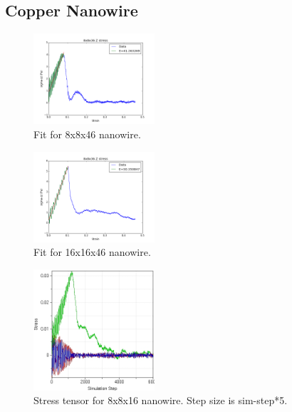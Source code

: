 \documentclass[11pt,twocolumn]{report}
\begin{document}
        \subsection{Copper Nanowire}
        \begin{figure}
            \label{fig:stress-small-fit}
            \centering
            \includegraphics[width=0.4\textwidth]{sigma33-small-fit.png}
            \caption{Fit for 8x8x46 nanowire.}
        \end{figure}
        \begin{figure}
            \label{fig:stress-large-fit}
            \centering
            \includegraphics[width=0.4\textwidth]{sigma33-large-fit.png}
            \caption{Fit for 16x16x46 nanowire.}
        \end{figure}
        \begin{figure}
            \label{fig:rawdata-small}
            \centering
            \includegraphics[width=0.4\textwidth]{StressvsSimulationStep-small.jpg}
            \caption{Stress tensor for 8x8x16 nanowire. Step size is sim-step*5.}
        \end{figure}
\end{document}
